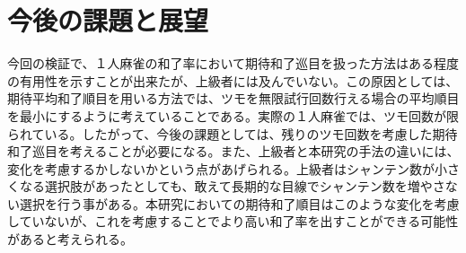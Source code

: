 \section{今後の課題と展望}
今回の検証で、１人麻雀の和了率において期待和了巡目を扱った方法はある程度の有用性を示すことが出来たが、上級者には及んでいない。この原因としては、期待平均和了順目を用いる方法では、ツモを無限試行回数行える場合の平均順目を最小にするように考えていることである。実際の１人麻雀では、ツモ回数が限られている。したがって、今後の課題としては、残りのツモ回数を考慮した期待和了巡目を考えることが必要になる。また、上級者と本研究の手法の違いには、変化を考慮するかしないかという点があげられる。上級者はシャンテン数が小さくなる選択肢があったとしても、敢えて長期的な目線でシャンテン数を増やさない選択を行う事がある。本研究においての期待和了順目はこのような変化を考慮していないが、これを考慮することでより高い和了率を出すことができる可能性があると考えられる。